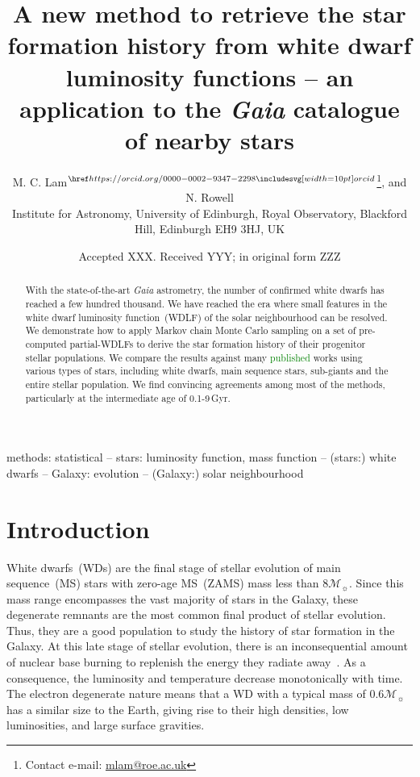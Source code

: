 \documentclass[fleqn,usenatbib]{mnras}
\title[Galactic SFH from \textit{Gaia} GCNS WDLF]{A new method to retrieve the star formation history from white dwarf luminosity functions -- an application to the \textit{Gaia} catalogue of nearby stars}
\author[M. C. Lam et al.]{
M. C. Lam$^{\orcid{0000-0002-9347-2298}}$\thanks{Contact e-mail: \href{mailto:mlam@roe.ac.uk}{mlam@roe.ac.uk}},
and N. Rowell
\\
Institute for Astronomy, University of Edinburgh, Royal Observatory, Blackford Hill, Edinburgh EH9 3HJ, UK
}
\date{Accepted XXX. Received YYY; in original form ZZZ}
\newcommand{\msun}{\mathcal{M}_{\sun}}
\begin{document}
\label{firstpage}
\pagerange{\pageref{firstpage}--\pageref{lastpage}}
\maketitle


\begin{abstract}
With the state-of-the-art \textit{Gaia} astrometry, the number of confirmed
white dwarfs has reached a few hundred thousand. We have reached the era where
small features in the white dwarf luminosity function~(WDLF) of the solar
neighbourhood can be resolved. We demonstrate how to apply Markov chain Monte
Carlo sampling on a set of pre-computed partial-WDLFs to derive the star
formation history of their progenitor stellar populations. We compare the
results against many \textcolor{green}{published} works using various types
of stars, including white dwarfs, main sequence stars, sub-giants and 
the entire stellar population. We find convincing
agreements among most of the methods, particularly at the intermediate age
of 0.1-9\,Gyr.

\end{abstract}

\begin{keywords}
methods: statistical -- stars: luminosity function, mass function --
(stars:) white dwarfs -- Galaxy: evolution -- (Galaxy:) solar neighbourhood
\end{keywords}



\section{Introduction}
White dwarfs~(WDs) are the final stage of stellar evolution of main
sequence~(MS) stars with zero-age MS~(ZAMS) mass less than $8\msun$. Since this
mass range encompasses the vast majority of stars in the Galaxy, these
degenerate remnants are the most common final product of stellar evolution.
Thus, they are a good population to study the history of star formation in the
Galaxy. At this late stage of stellar evolution, there is an inconsequential amount of nuclear
base burning to replenish the energy they radiate away~\citep{2010ApJ...717..183R}. As a consequence, the
luminosity and temperature decrease monotonically with time. The electron
degenerate nature means that a WD with a typical mass of $0.6\mathcal{M}_{\sun}$
has a similar size to the Earth, giving rise to their high densities, low
luminosities, and large surface gravities.
\end{document}
